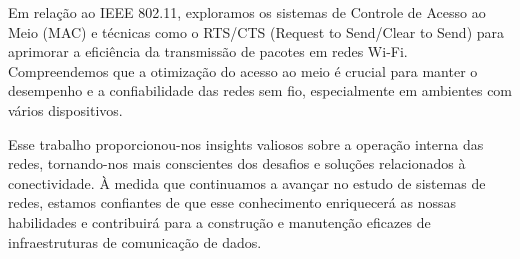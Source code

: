 \documentclass{article}
\begin{document}
Em relação ao IEEE 802.11, exploramos os sistemas de Controle de Acesso ao Meio (MAC) e técnicas como o RTS/CTS (Request to Send/Clear to Send) para aprimorar a eficiência da transmissão de pacotes em redes Wi-Fi. Compreendemos que a otimização do acesso ao meio é crucial para manter o desempenho e a confiabilidade das redes sem fio, especialmente em ambientes com vários dispositivos.

Esse trabalho proporcionou-nos insights valiosos sobre a operação interna das redes, tornando-nos mais conscientes dos desafios e soluções relacionados à conectividade. À medida que continuamos a avançar no estudo de sistemas de redes, estamos confiantes de que esse conhecimento enriquecerá as nossas habilidades e contribuirá para a construção e manutenção eficazes de infraestruturas de comunicação de dados.
\end{document}
